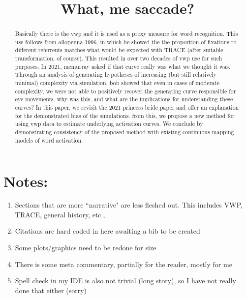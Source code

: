 \documentclass{article}
\title{What, me saccade?}
\date{}
\begin{document}

\maketitle

%

\begin{abstract}
Basically there is the vwp and it is used as a proxy measure for word recognition. This use follows from allopenna 1996, in which he showed the the proportion of fixations to different referrents matches what would be expected with TRACE (after suitable transformation, of course). This resulted in over two decades of vwp use for such purposes. In 2021, mcmurray asked if that curve really was what we thought it was. Through an analysis of generating hypotheses of increasing (but still relatively minimal) complexity via simulation, bob showed that even in cases of moderate complexity, we were not able to positively recover the generating curve responsible for eye movements. why was this, and what are the implications for understanding these curves? In this paper, we revisit the 2021 princess bride paper and offer an explanation for the demonstrated bias of the simulations. from this, we propose a new method for using vwp data to estimate underlying activation curves. We conclude by demonstrating consistency of the proposed method with existing continuous mapping models of word activation.
\end{abstract}

\section*{Notes:}

\begin{singlespace}
\begin{enumerate}
\vspace{-3mm}
\item Sections that are more ``narrative" are less fleshed out. This includes VWP, TRACE, general history, etc.,
\item Citations are hard coded in here awaiting a bib to be created
\item Some plots/graphics need to be redone for size
\item There is some meta commentary, partially for the reader, mostly for me
\item Spell check in my IDE is also not trivial (long story), so I have not really done that either (sorry)
\end{enumerate}
\end{singlespace}
\end{document}
